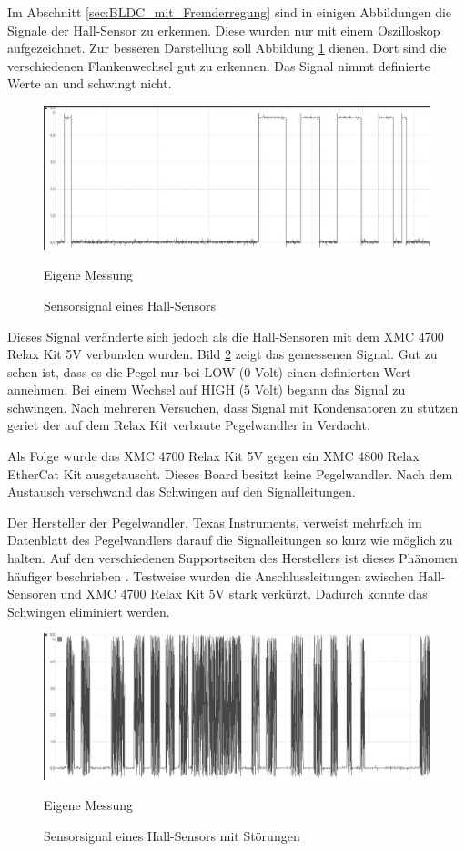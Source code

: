 Im Abschnitt \ref{sec:BLDC_mit_Fremderregung} sind in einigen Abbildungen die Signale der Hall-Sensor zu erkennen.
Diese wurden nur mit einem Oszilloskop aufgezeichnet.
Zur besseren Darstellung soll Abbildung \ref{fig:Hall_Sensor_OK} dienen.
Dort sind die verschiedenen Flankenwechsel gut zu erkennen.
Das Signal nimmt definierte Werte an und schwingt nicht.


\begin{figure}[ht]
	\centering
	\includegraphics[width=\textwidth-4cm]{tests/graphics/hall_ok}
	\caption[Sensorsignal Hall-Sensor]{Sensorsignal eines Hall-Sensors}
	\quelle Eigene Messung
	\label{fig:Hall_Sensor_OK}
\end{figure}


Dieses Signal veränderte sich jedoch als die Hall-Sensoren mit dem XMC 4700 Relax Kit 5V verbunden wurden.
Bild \ref{fig:Hall_Sensor_Fehlerhaft} zeigt das gemessenen Signal.
Gut zu sehen ist, dass es die Pegel nur bei LOW (0 Volt) einen definierten Wert annehmen.
Bei einem Wechsel auf HIGH (5 Volt) begann das Signal zu schwingen.
Nach mehreren Versuchen, dass Signal mit Kondensatoren zu stützen geriet der auf dem Relax Kit verbaute Pegelwandler in Verdacht.

Als Folge wurde das XMC 4700 Relax Kit 5V gegen ein XMC 4800 Relax EtherCat Kit ausgetauscht.
Dieses Board besitzt keine Pegelwandler.
Nach dem Austausch verschwand das Schwingen auf den Signalleitungen.

Der Hersteller der Pegelwandler, Texas Instruments, verweist mehrfach im Datenblatt des Pegelwandlers darauf die Signalleitungen so kurz wie möglich zu halten.
Auf den verschiedenen Supportseiten des Herstellers ist dieses Phänomen häufiger beschrieben \cite{Instruments2016}.
Testweise wurden die Anschlussleitungen zwischen Hall-Sensoren und XMC 4700 Relax Kit 5V stark verkürzt. Dadurch konnte das Schwingen eliminiert werden.

\begin{figure}[htbp]
	\centering
	\includegraphics[width=\textwidth-4cm]{tests/graphics/hall_jitter_4700}
	\caption[Fehlerhaftes Sensorsignal eines Hall-Sensors]{Sensorsignal eines Hall-Sensors mit Störungen}
	\quelle Eigene Messung
	\label{fig:Hall_Sensor_Fehlerhaft}
\end{figure}



